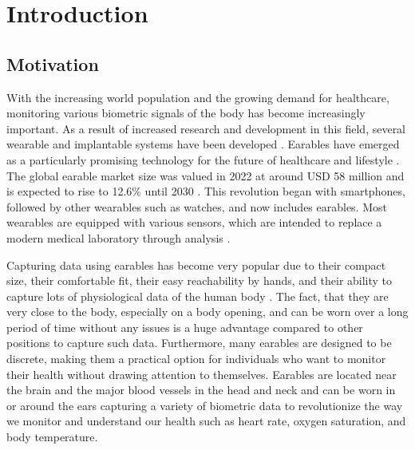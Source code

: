 \chapter{Introduction}
\label{ch:Introduction}

\section{Motivation}
With the increasing world population and the growing demand for healthcare, monitoring various biometric signals of the body has become increasingly important. 
As a result of increased research and development in this field, several wearable and implantable systems have been developed \cite{loncar-turukaloLiteratureWearableTechnology2019}.
Earables have emerged as a particularly promising technology for the future of healthcare and lifestyle \cite{trespGoingDigitalSurvey2016, kirkWearablesRevolutionStandardization2014a}. 
The global earable market size was valued in 2022 at around USD 58 million and is expected to rise to 12.6\% until 2030 \cite{GlobalEarphonesHeadphones}.
This revolution began with smartphones, followed by other wearables such as watches, and now includes earables. 
Most wearables are equipped with various sensors, which are intended to replace a modern medical laboratory through analysis \cite{loncar-turukaloLiteratureWearableTechnology2019}.

Capturing data using earables has become very popular due to their compact size, their comfortable fit, their easy reachability by hands, and their ability to capture lots of physiological data of the human body \cite{roddigerSensingEarablesSystematic2022a}. 
The fact, that they are very close to the body, especially on a body opening, and can be worn over a long period of time without any issues is a huge advantage compared to other positions to capture such data.
Furthermore, many earables are designed to be discrete, making them a practical option for individuals who want to monitor their health without drawing attention to themselves.
Earables are located near the brain and the major blood vessels in the head and neck and can be worn in or around the ears capturing a variety of biometric data to revolutionize the way we monitor and understand our health such as heart rate, oxygen saturation, and body temperature.

